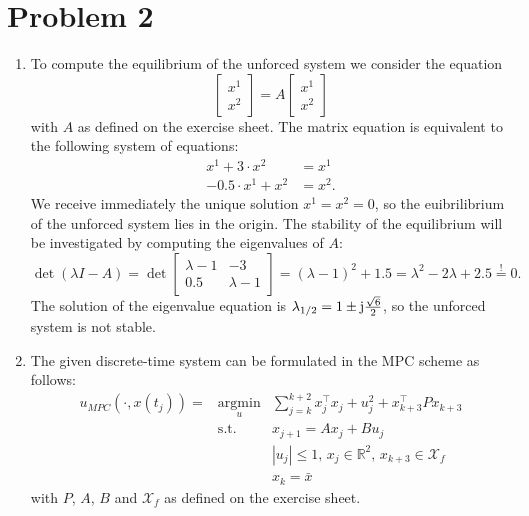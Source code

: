 \documentclass[12pt,pdftex,a4paper]{scrartcl}
\DeclareMathOperator*{\argmin}{argmin}
\begin{document}
\newpage
\section*{Problem 2}
\begin{enumerate}
    \item To compute the equilibrium of the unforced system we consider the equation
    \begin{equation*}
         \begin{bmatrix}
             x^1 \\ x^2
         \end{bmatrix}
         = A
         \begin{bmatrix}
             x^1 \\ x^2
         \end{bmatrix}
    \end{equation*}
    with $A$ as defined on the exercise sheet. The matrix equation is equivalent to the following system of equations:
    \begin{align*}
         x^1 + 3 \cdot x^2 &= x^1 \\
         -0.5 \cdot x^1 +x^2 &= x^2.
    \end{align*}
    We receive immediately the unique solution $x^1 = x^2 = 0$, so the euibrilibrium of the unforced system lies in the origin. The stability of the equilibrium will be investigated by computing the eigenvalues of $A$:
    \begin{equation*}         
         \det (\lambda I - A) = \det
         \begin{bmatrix}
            \lambda -1 & -3 \\
            0.5 & \lambda -1
         \end{bmatrix}
         = (\lambda -1)^2 +1.5 = \lambda^2 -2 \lambda +2.5 \overset{!}{=} 0.
    \end{equation*}
    The solution of the eigenvalue equation is $\lambda_{1/2} = 1 \pm \im \frac{\sqrt{6}}{2}$, so the unforced system is not stable.
    \item The given discrete-time system can be formulated in the MPC scheme as follows:
    \begin{equation} 
    \begin{array}{rcl} 
    u_{MPC} (\cdot , x(t_j)) = &\argmin\limits_u& \sum\limits_{j=k}^{k+2} x_j^\top x_j + u_j^2 +x_{k+3}^\top P x_{k+3} \\ 
    &\mathrm{s.t.}& x_{j+1} = A x_j + B u_j \\ 
    & & |u_j| \leq 1,\, x_j \in \mathbb{R}^2,\, x_{k+3} \in \mathcal{X}_f \\
    & & x_k = \bar{x}
    \end{array}      
    \end{equation}
    with $P$, $A$, $B$ and $\mathcal{X}_f$ as defined on the exercise sheet.
    

\end{enumerate}
\end{document}
